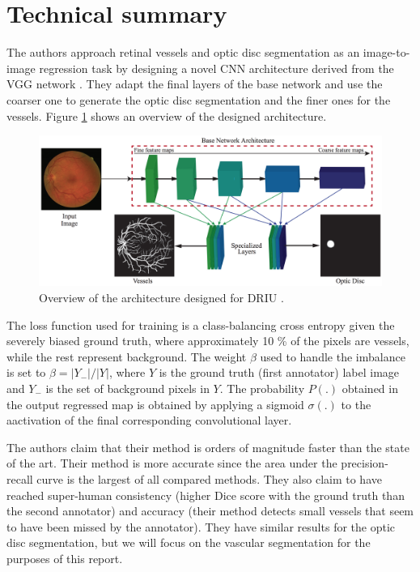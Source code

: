 \section{Technical summary}


The authors approach retinal vessels and optic disc segmentation as an image-to-image regression task by designing a novel CNN architecture derived from the VGG network \cite{simonyan_very_2014}. They adapt the final layers of the base network and use the coarser one to generate the optic disc segmentation and the finer ones for the vessels. Figure \ref{fig:driu} shows an overview of the designed architecture.

\begin{figure}[H]
  \includegraphics[width=\textwidth]{figures/driu}
  \caption{Overview of the architecture designed for DRIU \cite{maninis_deep_2016}.} \label{fig:driu}
\end{figure}

The loss function used for training is a class-balancing cross entropy given the severely biased ground truth, where approximately 10 \% of the pixels are vessels, while the rest represent background. The weight $\beta$ used to handle the imbalance is set to $\beta = |Y_-| / |Y|$, where $Y$ is the ground truth (first annotator) label image and $Y_-$ is the set of background pixels in $Y$. The probability $P(.)$ obtained in the output regressed map is obtained by applying a sigmoid $\sigma(.)$ to the aactivation of the final corresponding convolutional layer.

The authors claim that their method is orders of magnitude faster than the state of the art. Their method is more accurate since the area under the precision-recall curve is the largest of all compared methods. They also claim to have reached super-human consistency (higher Dice score with the ground truth than the second annotator) and accuracy (their method detects small vessels that seem to have been missed by the annotator). They have similar results for the optic disc segmentation, but we will focus on the vascular segmentation for the purposes of this report.
